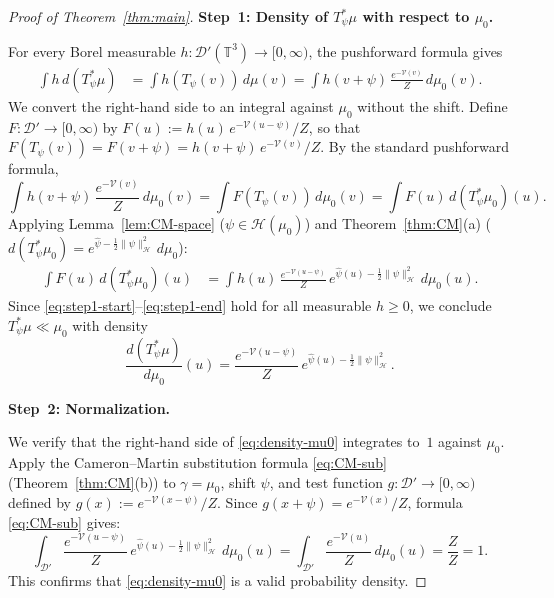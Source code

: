 \documentclass[11pt,a4paper]{article}
\theoremstyle{plain}
\theoremstyle{definition}
\newcommand{\T}{\mathbb{T}}
\newcommand{\cD}{\mathcal{D}}
\newcommand{\cH}{\mathcal{H}}
\newcommand{\cV}{\mathcal{V}}
\newcommand{\norm}[1]{\|#1\|}
\begin{document}
\begin{proof}[Proof of Theorem~\ref{thm:main}]

\medskip\noindent
\textbf{Step~1: Density of $T_\psi^*\mu$ with respect to $\mu_0$.}

For every Borel measurable $h:\cD'(\T^3)\to[0,\infty)$, the pushforward formula gives
\begin{align}
  \int h\,d(T_\psi^*\mu)
  &= \int h(T_\psi(v))\,d\mu(v)
   = \int h(v+\psi)\,\frac{e^{-\cV(v)}}{Z}\,d\mu_0(v). \label{eq:step1-start}
\end{align}
We convert the right-hand side to an integral against $\mu_0$ without the shift.
Define $F:\cD'\to[0,\infty)$ by
$F(u) := h(u)\,e^{-\cV(u-\psi)}/Z$,
so that $F(T_\psi(v)) = F(v+\psi) = h(v+\psi)\,e^{-\cV(v)}/Z$.
By the standard pushforward formula,
\[
  \int h(v+\psi)\,\frac{e^{-\cV(v)}}{Z}\,d\mu_0(v)
  = \int F(T_\psi(v))\,d\mu_0(v)
  = \int F(u)\,d(T_\psi^*\mu_0)(u).
\]
Applying Lemma~\ref{lem:CM-space} ($\psi\in\cH(\mu_0)$) and
Theorem~\ref{thm:CM}(a) ($d(T_\psi^*\mu_0) = e^{\hat\psi - \frac{1}{2}\norm\psi_\cH^2}\,d\mu_0$):
\begin{align}
  \int F(u)\,d(T_\psi^*\mu_0)(u)
  &= \int h(u)\,\frac{e^{-\cV(u-\psi)}}{Z}\,
     e^{\hat\psi(u)-\frac{1}{2}\norm\psi_\cH^2}\,d\mu_0(u). \label{eq:step1-end}
\end{align}
Since \eqref{eq:step1-start}--\eqref{eq:step1-end} hold for all measurable $h\ge0$,
we conclude $T_\psi^*\mu\ll\mu_0$ with density
\begin{equation}\label{eq:density-mu0}
  \frac{d(T_\psi^*\mu)}{d\mu_0}(u)
  = \frac{e^{-\cV(u-\psi)}}{Z}\,e^{\hat\psi(u)-\frac{1}{2}\norm\psi_\cH^2}.
\end{equation}

\medskip\noindent
\textbf{Step~2: Normalization.}

We verify that the right-hand side of \eqref{eq:density-mu0} integrates to~$1$ against $\mu_0$.
Apply the Cameron--Martin substitution formula \eqref{eq:CM-sub}
(Theorem~\ref{thm:CM}(b)) to $\gamma=\mu_0$, shift $\psi$, and
test function $g:\cD'\to[0,\infty)$ defined by
$g(x) := e^{-\cV(x-\psi)}/Z$.
Since $g(x+\psi) = e^{-\cV(x)}/Z$, formula \eqref{eq:CM-sub} gives:
\begin{equation}\label{eq:norm-check}
  \int_{\cD'}\frac{e^{-\cV(u-\psi)}}{Z}\,e^{\hat\psi(u)-\frac{1}{2}\norm\psi_\cH^2}\,d\mu_0(u)
  = \int_{\cD'}\frac{e^{-\cV(u)}}{Z}\,d\mu_0(u)
  = \frac{Z}{Z} = 1.
\end{equation}
This confirms that \eqref{eq:density-mu0} is a valid probability density.


\end{proof}
\end{document}
